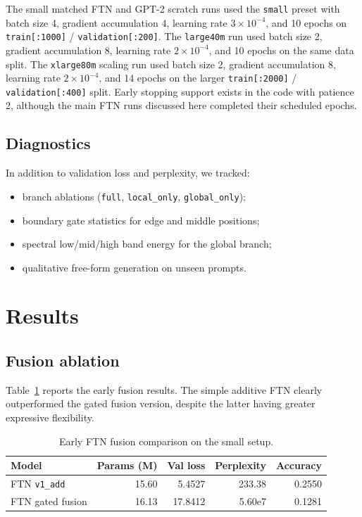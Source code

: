\documentclass[11pt]{article}
\begin{document}
The small matched FTN and GPT-2 scratch runs used the \texttt{small} preset with batch size 4, gradient accumulation 4, learning rate $3\times 10^{-4}$, and 10 epochs on \texttt{train[:1000]} / \texttt{validation[:200]}. The \texttt{large40m} run used batch size 2, gradient accumulation 8, learning rate $2\times 10^{-4}$, and 10 epochs on the same data split. The \texttt{xlarge80m} scaling run used batch size 2, gradient accumulation 8, learning rate $2\times 10^{-4}$, and 14 epochs on the larger \texttt{train[:2000]} / \texttt{validation[:400]} split. Early stopping support exists in the code with patience 2, although the main FTN runs discussed here completed their scheduled epochs.

\subsection{Diagnostics}
In addition to validation loss and perplexity, we tracked:
\begin{itemize}[leftmargin=1.5em]
    \item branch ablations (\texttt{full}, \texttt{local\_only}, \texttt{global\_only});
    \item boundary gate statistics for edge and middle positions;
    \item spectral low/mid/high band energy for the global branch;
    \item qualitative free-form generation on unseen prompts.
\end{itemize}

\section{Results}
\subsection{Fusion ablation}
Table~\ref{tab:fusion} reports the early fusion results. The simple additive FTN clearly outperformed the gated fusion version, despite the latter having greater expressive flexibility.

\begin{table}[ht]
    \centering
    \caption{Early FTN fusion comparison on the small setup.}
    \label{tab:fusion}
    \begin{tabular}{lrrrr}
        \toprule
        Model & Params (M) & Val loss & Perplexity & Accuracy \\
        \midrule
        FTN \texttt{v1\_add} & 15.60 & 5.4527 & 233.38 & 0.2550 \\
        FTN gated fusion & 16.13 & 17.8412 & 5.60e7 & 0.1281 \\
        \bottomrule
    \end{tabular}
\end{table}
\end{document}
